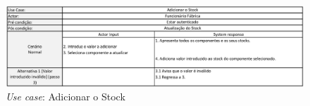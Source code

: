 \begin{figure}[ht]
    \centering
    \includegraphics[width=\textwidth]{analise_de_requisitos/img/use_cases/adicionar_stock.png}
    \caption{\textit{Use case}: Adicionar o Stock}
    \label{fig:uc_adicionar_stock}
\end{figure}

\clearpage